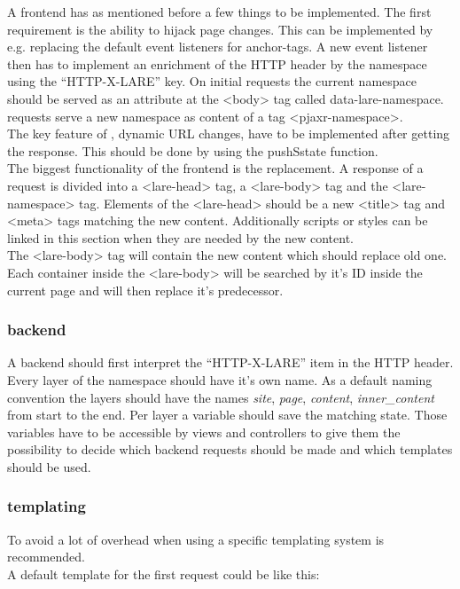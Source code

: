 A \lare{} frontend has as mentioned before a few things to be implemented.
The first requirement is the ability to hijack page changes.
This can be implemented by e.g. replacing the default event listeners for anchor-tags.
A new event listener then has to implement an enrichment of the HTTP header by the namespace using the \enquote{HTTP-X-LARE} key.
On initial requests the current namespace should be served as an attribute at the <body> tag called data-lare-namespace.
\lare{} requests serve a new namespace as content of a tag <pjaxr-namespace>.
\\
The key feature of \lare{}, dynamic URL changes, have to be implemented after getting the response.
This should be done by using the pushSstate function.
\\
The biggest functionality of the \lare{} frontend is the replacement.
A response of a \lare{} request is divided into a <lare-head> tag, a <lare-body> tag and the <lare-namespace> tag.
Elements of the <lare-head> should be a new <title> tag and <meta> tags matching the new content. 
Additionally scripts or styles can be linked in this section when they are needed by the new content.
\\
The <lare-body> tag will contain the new content which should replace old one.
Each container inside the <lare-body> will be searched by it's ID inside the current page and will then replace it's predecessor.

\subsubsection{\lare{} backend}

A \lare{} backend should first interpret the \enquote{HTTP-X-LARE} item in the HTTP header.
Every layer of the namespace should have it's own name.
As a default naming convention the layers should have the names \emph{site}, \emph{page}, \emph{content}, \emph{inner\_content} from start to the end.
Per layer a variable should save the matching state.
Those variables have to be accessible by views and controllers to give them the possibility to decide which backend requests should be made and which templates should be used.

\subsubsection{\lare{} templating}

To avoid a lot of overhead when using \lare{} a specific templating system is recommended.
\\
A default template for the first request could be like this:

